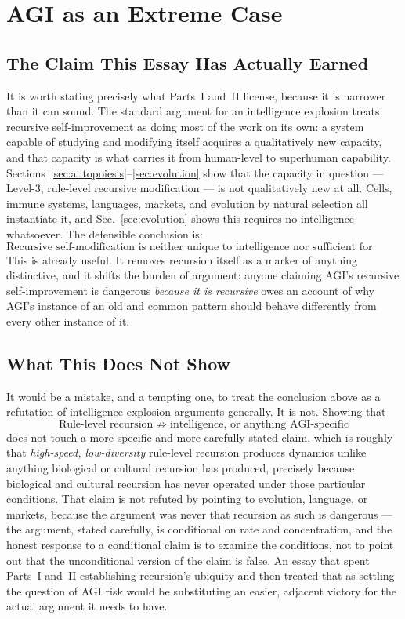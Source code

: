 \documentclass[12pt,a4paper]{article}
\theoremstyle{plain}
\theoremstyle{definition}
\theoremstyle{remark}
\begin{document}
\section{AGI as an Extreme Case}
\label{sec:agi-extreme-case}

\subsection{The Claim This Essay Has Actually Earned}
\label{subsec:earned-claim}

It is worth stating precisely what Parts~I and~II license, because it is narrower than it can sound. The standard argument for an intelligence explosion treats recursive self-improvement as doing most of the work on its own: a system capable of studying and modifying itself acquires a qualitatively new capacity, and that capacity is what carries it from human-level to superhuman capability. Sections~\ref{sec:autopoiesis}--\ref{sec:evolution} show that the capacity in question — Level-3, rule-level recursive modification — is not qualitatively new at all. Cells, immune systems, languages, markets, and evolution by natural selection all instantiate it, and Sec.~\ref{sec:evolution} shows this requires no intelligence whatsoever. The defensible conclusion is:
\[
\text{Recursive self-modification is neither unique to intelligence nor sufficient for intelligence.}
\]
This is already useful. It removes recursion itself as a marker of anything distinctive, and it shifts the burden of argument: anyone claiming AGI's recursive self-improvement is dangerous \emph{because it is recursive} owes an account of why AGI's instance of an old and common pattern should behave differently from every other instance of it.

\subsection{What This Does Not Show}
\label{subsec:overstatement-risk}

It would be a mistake, and a tempting one, to treat the conclusion above as a refutation of intelligence-explosion arguments generally. It is not. Showing that
\[
\text{Rule-level recursion} \;\not\Rightarrow\; \text{intelligence, or anything AGI-specific}
\]
does not touch a more specific and more carefully stated claim, which is roughly that \emph{high-speed, low-diversity} rule-level recursion produces dynamics unlike anything biological or cultural recursion has produced, precisely because biological and cultural recursion has never operated under those particular conditions. That claim is not refuted by pointing to evolution, language, or markets, because the argument was never that recursion as such is dangerous — the argument, stated carefully, is conditional on rate and concentration, and the honest response to a conditional claim is to examine the conditions, not to point out that the unconditional version of the claim is false. An essay that spent Parts~I and~II establishing recursion's ubiquity and then treated that as settling the question of AGI risk would be substituting an easier, adjacent victory for the actual argument it needs to have.
\end{document}
